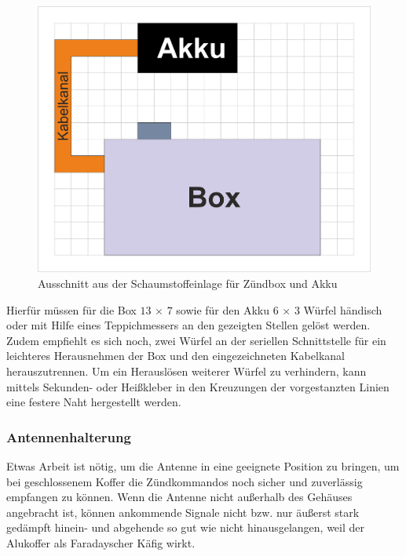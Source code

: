 \documentclass[paper=a4, parskip, numbers=noenddot, toc=listof, headsepline]{scrbook}
\begin{document}
						\begin{figure}
							\centering
							\includegraphics[width=.7\textwidth]{Bilder/foamcut.png}
							\caption{Ausschnitt aus der Schaumstoffeinlage für Zündbox und Akku}
							\label{fig:foamcut}
						\end{figure}

						Hierfür müssen für die Box $13\,\times\,7$ sowie für den Akku $6\,\times\,3$ Würfel händisch oder mit Hilfe eines Teppichmessers an den gezeigten Stellen gelöst werden. Zudem empfiehlt es sich noch, zwei Würfel an der seriellen Schnittstelle für ein leichteres Herausnehmen der Box und den eingezeichneten Kabelkanal herauszutrennen. Um ein Herauslösen weiterer Würfel zu verhindern, kann mittels Sekunden- oder Heißkleber in den Kreuzungen der vorgestanzten Linien eine festere Naht hergestellt werden.

					\subsubsection{Antennenhalterung}

						Etwas Arbeit ist nötig, um die Antenne in eine geeignete Position zu bringen, um bei geschlossenem Koffer die Zündkommandos noch sicher und zuverlässig empfangen zu können. Wenn die Antenne nicht außerhalb des Gehäuses angebracht ist, können ankommende Signale nicht bzw. nur äußerst stark gedämpft hinein- und abgehende so gut wie nicht hinausgelangen, weil der Alukoffer als Faradayscher Käfig wirkt.
\end{document}
